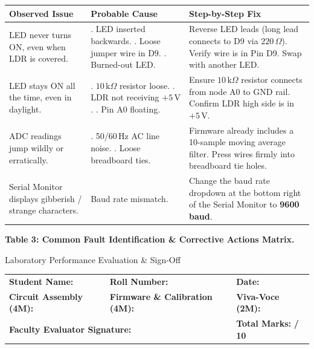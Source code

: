 \documentclass[12pt,a4paper]{article}
\begin{document}
\begin{center}
\small
\renewcommand{\arraystretch}{1.2}
\begin{tabularx}{\textwidth}{|>{\raggedright\arraybackslash}p{4.0cm}|>{\raggedright\arraybackslash}p{4.2cm}|X|}
\hline
\textbf{Observed Issue} & \textbf{Probable Cause} & \textbf{Step-by-Step Fix} \\
\hline
LED never turns ON, even when LDR is covered. & 
1. LED inserted backwards. \newline
2. Loose jumper wire in D9. \newline
3. Burned-out LED. & 
Reverse LED leads (long lead connects to D9 via $220\,\Omega$). Verify wire is in Pin D9. Swap with another LED. \\
\hline
LED stays ON all the time, even in daylight. & 
1. $10\,\text{k}\Omega$ resistor loose. \newline
2. LDR not receiving $+5\,\text{V}$. \newline
3. Pin A0 floating. & 
Ensure $10\,\text{k}\Omega$ resistor connects from node A0 to GND rail. Confirm LDR high side is in $+5\,\text{V}$. \\
\hline
ADC readings jump wildly or erratically. & 
1. 50/60\,Hz AC line noise. \newline
2. Loose breadboard ties. & 
Firmware already includes a 10-sample moving average filter. Press wires firmly into breadboard tie holes. \\
\hline
Serial Monitor displays gibberish / strange characters. & 
Baud rate mismatch. & 
Change the baud rate dropdown at the bottom right of the Serial Monitor to \textbf{9600 baud}. \\
\hline
\end{tabularx}
\vspace{0.15cm}
{\small\textbf{Table 3: Common Fault Identification \& Corrective Actions Matrix.}}
\end{center}

\vspace{0.2cm}

\begin{stepbox}{Laboratory Performance Evaluation \& Sign-Off}
\begin{tabularx}{\textwidth}{X X X}
\textbf{Student Name:} \hrulefill & \textbf{Roll Number:} \hrulefill & \textbf{Date:} \hrulefill \\[0.25cm]
\textbf{Circuit Assembly (4M):} \hrulefill & \textbf{Firmware \& Calibration (4M):} \hrulefill & \textbf{Viva-Voce (2M):} \hrulefill \\[0.25cm]
\multicolumn{2}{l}{\textbf{Faculty Evaluator Signature:} \hrulefill} & \textbf{Total Marks:} \quad \textbf{/ 10} \\
\end{tabularx}
\end{stepbox}
\end{document}
